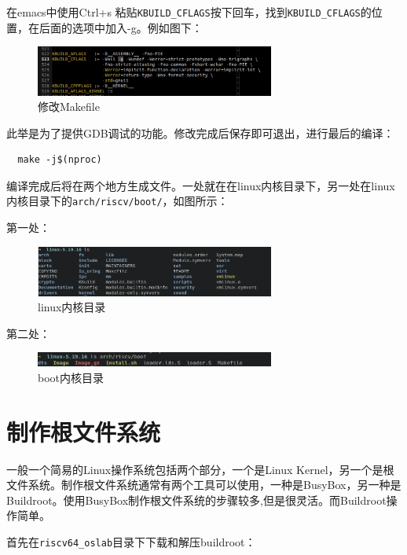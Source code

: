 \documentclass[lang=cn,10pt]{elegantbook}
\begin{document}
在emacs中使用Ctrl+s 粘贴\lstinline{KBUILD_CFLAGS}按下回车，找到\lstinline{KBUILD_CFLAGS}的位置，在后面的选项中加入-g。例如图下：

\begin{figure}[htbp]
  \centering
  \includegraphics[width=0.7\textwidth]{image/image-20231105100304040.png}
  \caption{修改Makefile}
\end{figure}


此举是为了提供GDB调试的功能。修改完成后保存即可退出，进行最后的编译：

\begin{lstlisting}
  make -j$(nproc)	
\end{lstlisting}

\newpage
编译完成后将在两个地方生成文件。一处就在在linux内核目录下，另一处在linux内核目录下的\lstinline{arch/riscv/boot/}，如图所示：

第一处：
\begin{figure}[htbp]
  \centering
  \includegraphics[width=0.7\textwidth]{image/image-20231105100626287.png}
  \caption{linux内核目录}
\end{figure}

第二处：
\begin{figure}[htbp]
  \centering
  \includegraphics[width=0.7\textwidth]{image/image-20231105100648963.png}
  \caption{boot内核目录}
\end{figure}

\section{制作根文件系统}
一般一个简易的Linux操作系统包括两个部分，一个是Linux Kernel，另一个是根文件系统。制作根文件系统通常有两个工具可以使用，一种是BusyBox，另一种是Buildroot。使用BusyBox制作根文件系统的步骤较多,但是很灵活。而Buildroot操作简单。

首先在\lstinline{riscv64_oslab}目录下下载和解压buildroot：
\end{document}
